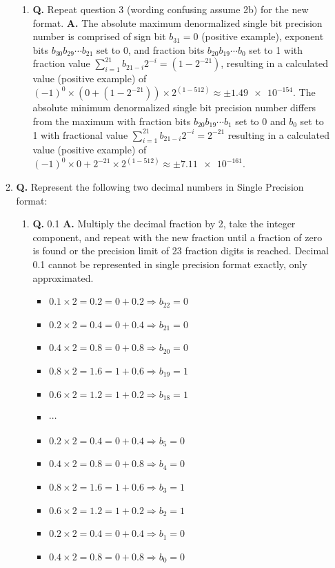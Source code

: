 \documentclass[main.tex]{subfiles}
\begin{document}
\begin{enumerate}
\begin{enumerate}
\begin{enumerate}
        \item \textbf{Q.} Repeat question 3 (wording confusing assume 2b) for the new format. \textbf{A.} The absolute maximum denormalized single bit precision number is comprised of sign bit $b_{31} = 0$ (positive example), exponent bits $b_{30} b_{29} \cdots b_{21}$ set to 0, and fraction bits $b_{20} b_{19} \cdots b_{0}$ set to 1 with fraction value $\sum_{i=1}^{21} b_{21-i} 2^{-i} = (1-2^{-21})$, resulting in a calculated value (positive example) of $(-1)^0 \times (0+(1-2^{-21})) \times 2^{(1-512)} \approx \pm\num{1.49e-154}$. The absolute minimum denormalized single bit precision number differs from the maximum with fraction bits $b_{20} b_{19} \cdots b_{1}$ set to 0 and $b_{0}$ set to 1 with fractional value $\sum_{i=1}^{21} b_{21-i} 2^{-i} = 2^{-21}$ resulting in a calculated value (positive example) of $(-1)^0 \times 0+2^{-21} \times 2^{(1-512)} \approx \pm\num{7.11e-161}$.
    
    \end{enumerate}
    
    \item \textbf{Q.} Represent the following two decimal numbers in Single Precision format:
    
    \begin{enumerate}
        \item \textbf{Q.} 0.1 \textbf{A.} Multiply the decimal fraction by 2, take the integer component, and repeat with the new fraction until a fraction of zero is found or the precision limit of 23 fraction digits is reached. Decimal 0.1 cannot be represented in single precision format exactly, only approximated.
        
        \medskip
        
        \begin{itemize}[label={}]
            \item $0.1 \times 2 = 0.2 = 0 + 0.2 \Rightarrow b_{22}=0$
            \item $0.2 \times 2 = 0.4 = 0 + 0.4 \Rightarrow b_{21}=0$
            \item $0.4 \times 2 = 0.8 = 0 + 0.8 \Rightarrow b_{20}=0$
            \item $0.8 \times 2 = 1.6 = 1 + 0.6 \Rightarrow b_{19}=1$
            \item $0.6 \times 2 = 1.2 = 1 + 0.2 \Rightarrow b_{18}=1$
            \item $\cdots$
            \item $0.2 \times 2 = 0.4 = 0 + 0.4 \Rightarrow b_{5}=0$
            \item $0.4 \times 2 = 0.8 = 0 + 0.8 \Rightarrow b_{4}=0$
            \item $0.8 \times 2 = 1.6 = 1 + 0.6 \Rightarrow b_{3}=1$
            \item $0.6 \times 2 = 1.2 = 1 + 0.2 \Rightarrow b_{2}=1$
            \item $0.2 \times 2 = 0.4 = 0 + 0.4 \Rightarrow b_{1}=0$
            \item $0.4 \times 2 = 0.8 = 0 + 0.8 \Rightarrow b_{0}=0$
        \end{itemize}
        

\end{enumerate}
\end{enumerate}
\end{enumerate}
\end{document}
